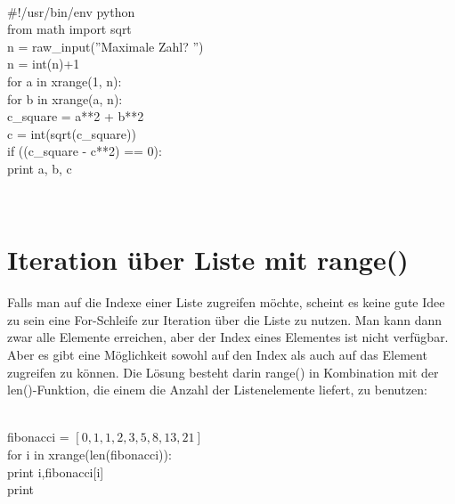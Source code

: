 \\
\begin{MyConsoleBox}{
\#!/usr/bin/env python \\
from math import sqrt \\
n = raw\_input(''Maximale Zahl? '') \\
n = int(n)+1 \\
for a in xrange(1, n): \\
\hspace{0.5cm}    for b in xrange(a, n): \\
\hspace{1.0cm}        c\_square = a**2 + b**2 \\
\hspace{1.0cm}        c = int(sqrt(c\_square)) \\
\hspace{1.0cm}        if ((c\_square - c**2) == 0): \\
\hspace{1.5cm}            print a, b, c \\
}\end{MyConsoleBox}
\\
\section{Iteration über Liste mit range()}
Falls man auf die Indexe einer Liste zugreifen möchte, scheint es keine gute Idee zu sein eine For-Schleife zur Iteration über die Liste zu nutzen. Man kann dann zwar alle Elemente erreichen, aber der Index eines Elementes ist nicht verfügbar. Aber es gibt eine Möglichkeit sowohl auf den Index als auch auf das Element zugreifen zu können. Die Lösung besteht darin range() in Kombination mit der len()-Funktion, die einem die Anzahl der Listenelemente liefert, zu benutzen: \\
\\
\begin{MyConsoleBox}{
fibonacci = $[0,1,1,2,3,5,8,13,21]$ \\
for i in xrange(len(fibonacci)): \\
\hspace{0.5cm}    print i,fibonacci[i] \\
print \\
}\end{MyConsoleBox}
\\
